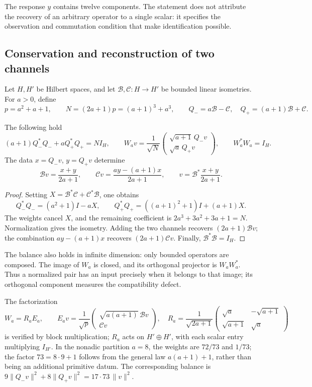 The response \(y\) contains twelve components. The statement does not
attribute the recovery of an arbitrary operator to a single scalar:
it specifies the observation and commutation condition that make identification possible.

\subsection{Conservation and reconstruction of two channels}
\label{v:subsec:acoplamiento-bilateral}

Let \(H,H'\) be Hilbert spaces, and let
\(\mathcal B,\mathcal C:H\to H'\) be bounded linear isometries.
For \(a>0\), define
\[
 p=a^2+a+1,\qquad N=(2a+1)p=(a+1)^3+a^3,\qquad
 Q_-=a\mathcal B-\mathcal C,\quad Q_+=(a+1)\mathcal B+\mathcal C.
\]

\begin{theorem}
\label{v:thm:acoplamiento-balance}
The following hold
\[
 (a+1)Q_-^*Q_-+aQ_+^*Q_+=NI_H,\qquad
 W_av=\frac1{\sqrt N}
 \begin{pmatrix}\sqrt{a+1}\,Q_-v\\\sqrt a\,Q_+v\end{pmatrix},
 \qquad W_a^*W_a=I_H.
\]
The data \(x=Q_-v\), \(y=Q_+v\) determine
\[
 \mathcal Bv=\frac{x+y}{2a+1},\qquad
 \mathcal Cv=\frac{ay-(a+1)x}{2a+1},\qquad
 v=\mathcal B^*\frac{x+y}{2a+1}.
\]
\end{theorem}
\begin{proof}
Setting \(X=\mathcal B^*\mathcal C+\mathcal C^*\mathcal B\), one obtains
\[
 Q_-^*Q_-=(a^2+1)I-aX,\qquad
 Q_+^*Q_+=((a+1)^2+1)I+(a+1)X.
\]
The weights cancel \(X\), and the remaining coefficient is
\(2a^3+3a^2+3a+1=N\). Normalization gives the isometry.
Adding the two channels recovers \((2a+1)\mathcal Bv\);
the combination \(ay-(a+1)x\) recovers \((2a+1)\mathcal Cv\).
Finally, \(\mathcal B^*\mathcal B=I_H\).
\end{proof}

The balance also holds in infinite dimension: only bounded operators
are composed. The image of \(W_a\) is closed, and its orthogonal
projector is \(W_aW_a^*\). Thus a normalized pair has an
input precisely when it belongs to that image; its orthogonal
component measures the compatibility defect.

The factorization
\[
 W_a=R_aE_a,\qquad
 E_av=\frac1{\sqrt p}
 \begin{pmatrix}\sqrt{a(a+1)}\,\mathcal Bv\\\mathcal Cv\end{pmatrix},
 \quad
 R_a=\frac1{\sqrt{2a+1}}
 \begin{pmatrix}\sqrt a&-\sqrt{a+1}\\
 \sqrt{a+1}&\sqrt a\end{pmatrix}
\]
is verified by block multiplication; \(R_a\) acts on
\(H'\oplus H'\), with each scalar entry multiplying \(I_{H'}\).
In the nonadic partition
\(a=8\), the weights are \(72/73\) and \(1/73\); the factor
\(73=8\cdot9+1\) follows from the general law
\(a(a+1)+1\), rather than being an additional primitive datum. The corresponding balance is
\(9\|Q_-v\|^2+8\|Q_+v\|^2=17\cdot73\,\|v\|^2\).


